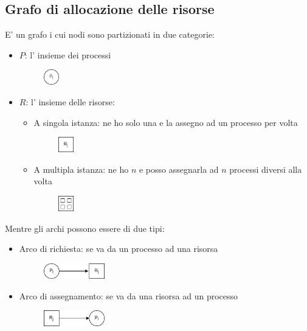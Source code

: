 \subsection{Grafo di allocazione delle risorse}
E' un grafo i cui nodi sono partizionati in due categorie:
\begin{itemize}
    \item $P$: l' insieme dei processi
        \begin{figure}[H]
            \centering
            \includegraphics[width=25px]{images/8_Deadlock/process.png}
        \end{figure}
    \item $R$: l' insieme delle risorse:
        \begin{itemize}
            \item A singola istanza: ne ho solo una e la assegno ad un processo per volta
                \begin{figure}[H]
                    \centering
                    \includegraphics[width=25px]{images/8_Deadlock/single_resource.png}
                \end{figure}
            \item A multipla istanza: ne ho $n$ e posso assegnarla ad $n$ processi diversi alla volta
                \begin{figure}[H]
                    \centering
                    \includegraphics[width=25px]{images/8_Deadlock/multiple_resource.png}
                \end{figure}
        \end{itemize}
\end{itemize}
Mentre gli archi possono essere di due tipi:
\begin{itemize}
    \item Arco di richiesta: se va da un processo ad una risorsa
        \begin{figure}[H]
            \centering
            \includegraphics[width=100px]{images/8_Deadlock/request_edge.png}
        \end{figure}
    \item Arco di assegnamento: se va da una risorsa ad un processo
        \begin{figure}[H]
            \centering
            \includegraphics[width=100px]{images/8_Deadlock/assignment_edge.png}
        \end{figure}
\end{itemize}

